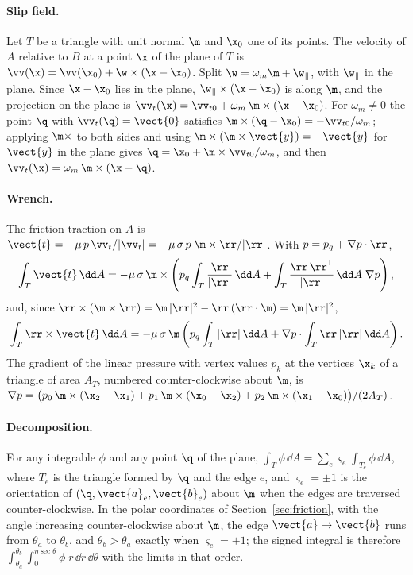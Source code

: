 \paragraph{Slip field.} Let $T$ be a triangle with unit normal $\m$ and $\x_0$ one of its
points. The velocity of $A$ relative to $B$ at a point $\x$ of the plane of $T$ is
$\vv(\x) = \vv(\x_0) + \w\times(\x - \x_0)$. Split $\w = \omega_m\m + \w_\parallel$, with
$\w_\parallel$ in the plane. Since $\x - \x_0$ lies in the plane,
$\w_\parallel\times(\x-\x_0)$ is along $\m$, and the projection on the plane is
$\vv_t(\x) = \vv_{t0} + \omega_m\,\m\times(\x - \x_0)$. For $\omega_m \ne 0$ the point $\q$ with
$\vv_t(\q) = \vect{0}$ satisfies $\m\times(\q - \x_0) = -\vv_{t0}/\omega_m$; applying
$\m\times$ to both sides and using $\m\times(\m\times\vect{y}) = -\vect{y}$ for $\vect{y}$ in the
plane gives $\q = \x_0 + \m\times\vv_{t0}/\omega_m$, and then
$\vv_t(\x) = \omega_m\,\m\times(\x - \q)$.

\paragraph{Wrench.} The friction traction on $A$ is
$\vect{t} = -\mu\,p\,\vv_t/|\vv_t| = -\mu\,\sigma\,p\;\m\times\rr/|\rr|$. With
$p = p_q + \nabla p\cdot\rr$,
\[
  \int_T \vect{t}\,\dd A
  = -\mu\,\sigma\,\m\times\left(p_q\int_T\frac{\rr}{|\rr|}\,\dd A
     + \int_T\frac{\rr\,\rr^{\mathsf T}}{|\rr|}\,\dd A\;\nabla p\right),
\]
and, since $\rr\times(\m\times\rr) = \m\,|\rr|^2 - \rr\,(\rr\cdot\m) = \m\,|\rr|^2$,
\[
  \int_T \rr\times\vect{t}\,\dd A
  = -\mu\,\sigma\,\m\left(p_q\int_T|\rr|\,\dd A + \nabla p\cdot\int_T\rr\,|\rr|\,\dd A\right).
\]
The gradient of the linear pressure with vertex values $p_k$ at the vertices $\x_k$ of a
triangle of area $A_T$, numbered counter-clockwise about $\m$, is
$\nabla p = \bigl(p_0\,\m\times(\x_2-\x_1) + p_1\,\m\times(\x_0-\x_2)
+ p_2\,\m\times(\x_1-\x_0)\bigr)/(2A_T)$.

\paragraph{Decomposition.} For any integrable $\phi$ and any point $\q$ of the plane,
$\int_T\phi\,\dd A = \sum_e \varsigma_e\int_{T_e}\phi\,\dd A$, where $T_e$ is the triangle formed
by $\q$ and the edge $e$, and $\varsigma_e = \pm1$ is the orientation of $(\q, \vect{a}_e,
\vect{b}_e)$ about $\m$ when the edges are traversed counter-clockwise. In the polar coordinates
of Section~\ref{sec:friction}, with the angle increasing counter-clockwise about $\m$, the edge
$\vect{a}\to\vect{b}$ runs from $\theta_a$ to $\theta_b$, and $\theta_b > \theta_a$ exactly when
$\varsigma_e = +1$; the signed integral is therefore
$\int_{\theta_a}^{\theta_b}\int_0^{\eta\sec\theta}\phi\; r\,\dd r\,\dd\theta$ with the limits in
that order.

